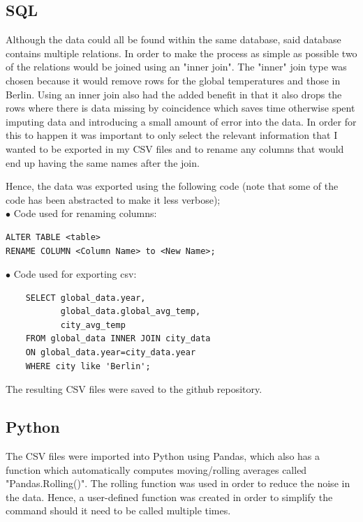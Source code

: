 \documentclass[journal, a4paper]{IEEEtran}
\begin{document}
    \subsection{SQL}

    Although the data could all be found within the same database, said database contains multiple relations. In order to make the process as simple as possible two of the relations would be joined using an "inner join". The "inner" join type was chosen because it would remove rows for the global temperatures and those in Berlin. Using an inner join also had the added benefit in that it also drops the rows where there is data missing by coincidence which saves time otherwise spent imputing data and introducing a small amount of error into the data. In order for this to happen it was important to only select the relevant information that I wanted to be exported in my CSV files and to rename any columns that would end up having the same names after the join.

    \newpage

    Hence, the data was exported using the following code (note that some of the code has been abstracted to make it less verbose);\\

    $\bullet$ Code used for renaming columns:
    \begin{small}
    \begin{lstlisting}
ALTER TABLE <table>
RENAME COLUMN <Column Name> to <New Name>;
    \end{lstlisting}
    \end{small}

    $\bullet$ Code used for exporting csv:
    \begin{small}
    \begin{lstlisting}
    SELECT global_data.year,
           global_data.global_avg_temp,
           city_avg_temp
    FROM global_data INNER JOIN city_data
    ON global_data.year=city_data.year
    WHERE city like 'Berlin';
    \end{lstlisting}
    \end{small}

    \noindent The resulting CSV files were saved to the github repository.

    \subsection{Python}

    The CSV files were imported into Python using Pandas, which also has a function which automatically computes moving/rolling averages called "Pandas.Rolling()". The rolling function was used in order to reduce the noise in the data. Hence, a user-defined function was created in order to simplify the command should it need to be called multiple times.
\end{document}
